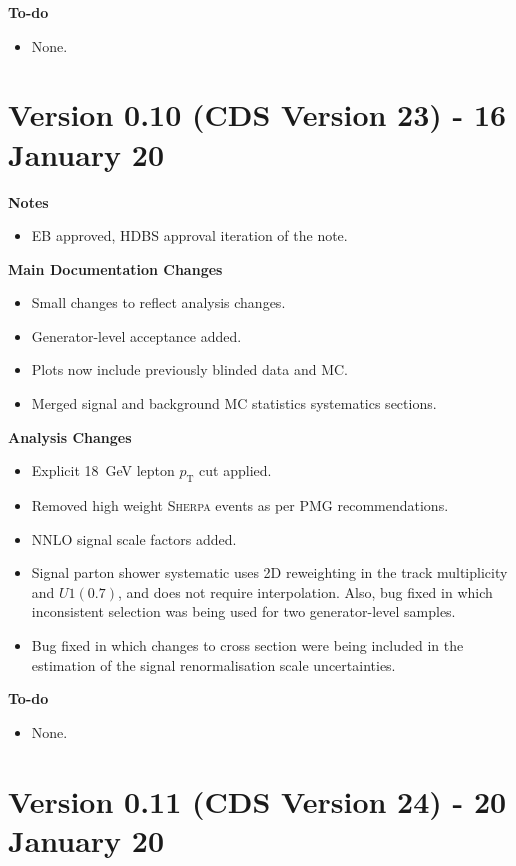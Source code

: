 \documentclass[NOTE, atlasdraft=true, texlive=2017, UKenglish]{\ATLASLATEXPATH atlasdoc}
\begin{document}
\textbf{To-do}
\begin{itemize}
\item None.
\end{itemize}


\section*{Version 0.10 (CDS Version 23) - 16 January 20}

\textbf{Notes}
\begin{itemize}
\item EB approved, HDBS approval iteration of the note.
\end{itemize}

\textbf{Main Documentation Changes}
\begin{itemize}
\item Small changes to reflect analysis changes.
\item Generator-level acceptance added.
\item Plots now include previously blinded data and MC.
\item Merged signal and background MC statistics systematics sections.
\end{itemize}

\textbf{Analysis Changes}
\begin{itemize}
\item Explicit 18~GeV lepton $p_\text{T}$ cut applied.
\item Removed high weight \textsc{Sherpa} events as per PMG recommendations.
\item NNLO signal scale factors added.
\item Signal parton shower systematic uses 2D reweighting in the track multiplicity and $U1(0.7)$, and does not require interpolation. Also, bug fixed in which inconsistent selection was being used for two generator-level samples.
\item Bug fixed in which changes to cross section were being included in the estimation of the signal renormalisation scale uncertainties.
\end{itemize}

\textbf{To-do}
\begin{itemize}
\item None.
\end{itemize}


\section*{Version 0.11 (CDS Version 24) - 20 January 20}
\end{document}

